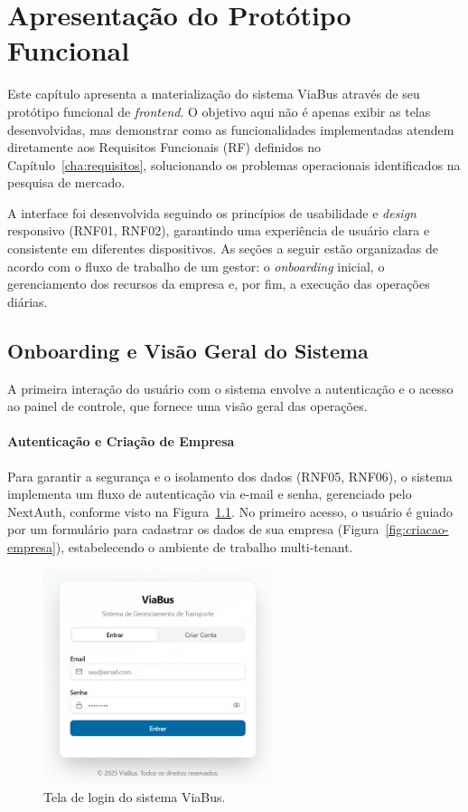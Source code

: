 \chapter{Apresentação do Protótipo Funcional}
\label{cha:funcionalidades}

Este capítulo apresenta a materialização do sistema ViaBus através de seu protótipo funcional de \textit{frontend}. O objetivo aqui não é apenas exibir as telas desenvolvidas, mas demonstrar como as funcionalidades implementadas atendem diretamente aos Requisitos Funcionais (RF) definidos no Capítulo~\ref{cha:requisitos}, solucionando os problemas operacionais identificados na pesquisa de mercado.

A interface foi desenvolvida seguindo os princípios de usabilidade e \textit{design} responsivo (RNF01, RNF02), garantindo uma experiência de usuário clara e consistente em diferentes dispositivos. As seções a seguir estão organizadas de acordo com o fluxo de trabalho de um gestor: o \textit{onboarding} inicial, o gerenciamento dos recursos da empresa e, por fim, a execução das operações diárias.

\section{Onboarding e Visão Geral do Sistema}

A primeira interação do usuário com o sistema envolve a autenticação e o acesso ao painel de controle, que fornece uma visão geral das operações.

\subsubsection{Autenticação e Criação de Empresa}
Para garantir a segurança e o isolamento dos dados (RNF05, RNF06), o sistema implementa um fluxo de autenticação via e-mail e senha, gerenciado pelo NextAuth, conforme visto na Figura~\ref{fig:tela-login}. No primeiro acesso, o usuário é guiado por um formulário para cadastrar os dados de sua empresa (Figura~\ref{fig:criacao-empresa}), estabelecendo o ambiente de trabalho multi-tenant.

\begin{figure}[H]
  \centering
  \includegraphics[width=0.6\textwidth]{imagens/tela-login.png}
  \caption{Tela de login do sistema ViaBus.}
  \label{fig:tela-login}
\end{figure}

